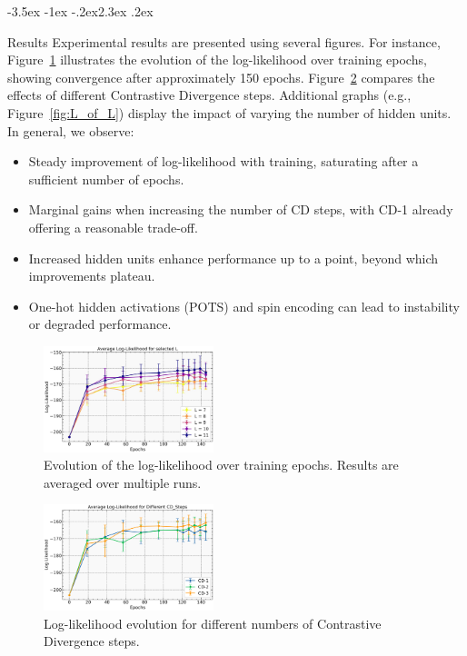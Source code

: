 \documentclass[prl,twocolumn]{revtex4-1}
\makeatletter
\renewcommand{\section}{\@startsection{section}{1}{\z@}%
    {-3.5ex \@plus -1ex \@minus -.2ex}{2.3ex \@plus.2ex}%
    {\normalfont\bfseries\raggedright}}
\makeatother
\begin{document}
\section{Results}
\label{sec:results}
Experimental results are presented using several figures. For instance, Figure~\ref{fig:L_of_epochs} illustrates the evolution of the log-likelihood over training epochs, showing convergence after approximately 150 epochs. Figure~\ref{fig:L_of_CD} compares the effects of different Contrastive Divergence steps. Additional graphs (e.g., Figure~\ref{fig:L_of_L}) display the impact of varying the number of hidden units. In general, we observe:
\begin{itemize}
	\item Steady improvement of log-likelihood with training, saturating after a sufficient number of epochs.
	\item Marginal gains when increasing the number of CD steps, with CD-1 already offering a reasonable trade-off.
	\item Increased hidden units enhance performance up to a point, beyond which improvements plateau.
	\item One-hot hidden activations (POTS) and spin encoding can lead to instability or degraded performance.
\end{itemize}

\begin{figure}[!tb]
	\includegraphics[width=0.44\textwidth]{L_of_epochs.jpg}
	\caption{Evolution of the log-likelihood over training epochs. Results are averaged over multiple runs.}
	\label{fig:L_of_epochs}
\end{figure}

\begin{figure}[!tb]
	\includegraphics[width=0.44\textwidth]{L_of_CD.png}
	\caption{Log-likelihood evolution for different numbers of Contrastive Divergence steps.}
	\label{fig:L_of_CD}
\end{figure}
\end{document}
